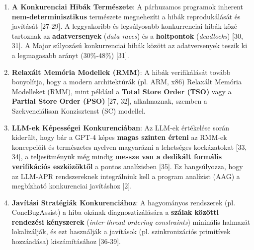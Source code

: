 \begin{enumerate}
    \item \textbf{A Konkurenciai Hibák Természete}:
    A párhuzamos programok inherent \textbf{nem-determinisztikus} természete megnehezíti a hibák reprodukálását és javítását [27-29]. A leggyakoribb és legsúlyosabb konkurrenciai hibák közé tartoznak az \textbf{adatversenyek} (\emph{data races}) és a \textbf{holtpontok} (\emph{deadlocks}) [30, 31]. A Major súlyozású konkurrenciai hibák között az adatversenyek teszik ki a legmagasabb arányt (30\%-48\%) [31].

    \item \textbf{Relaxált Memória Modellek (RMM)}:
    A hibák verifikálását tovább bonyolítja, hogy a modern architektúrák (pl. ARM, x86) Relaxált Memória Modelleket (RMM), mint például a \textbf{Total Store Order (TSO)} vagy a \textbf{Partial Store Order (PSO)} [27, 32], alkalmaznak, szemben a Szekvenciálisan Konzisztenst (SC) modellel.
    
    \item \textbf{LLM-ek Képességei Konkurenciában}:
    Az LLM-ek értékelése során kiderült, hogy bár a GPT-4 képes \textbf{magas szinten érteni} az RMM-ek koncepcióit és természetes nyelven magyarázni a lehetséges kockázatokat [33, 34], a teljesítményük még mindig \textbf{messze van a dedikált formális verifikációs eszközöktől} a pontos analízisben [35]. Ez hangsúlyozza, hogy az LLM-APR rendszereknek integrálniuk kell a program analízist (AAG) a megbízható konkurenciai javításhoz [2].

    \item \textbf{Javítási Stratégiák Konkurenciához}:
    A hagyományos rendszerek (pl. ConcBugAssist) a hiba okának diagnosztizálására a \textbf{szálak közötti rendezési kényszerek} (\emph{inter-thread ordering constraints}) mininális halmazát lokalizálják, és ezt használják a javítások (pl. szinkronizációs primitívek hozzáadása) kiszámításához [36-39].
\end{enumerate}

